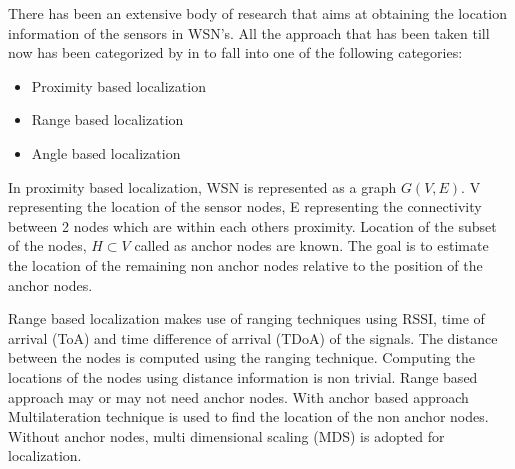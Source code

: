 

There has been an extensive body of research that aims at obtaining the location information of the sensors in WSN's. All the approach that has been taken till now has been categorized by \citeauthor{wang2010survey} in \cite{wang2010survey} to fall into one of the following categories:
\begin{itemize}
\item Proximity based localization
\item Range based localization
\item Angle based localization
\end{itemize}

In proximity based localization\cite{bulusu2000gps,4317866,shang2003localization}, WSN is represented as a graph $G(V,E)$. V representing the location of the sensor nodes, E representing the connectivity between 2 nodes which are within each others proximity. Location of the  subset of the nodes, $H \subset V$ called as anchor nodes are known. The goal is to estimate the location of the remaining non anchor nodes relative to the position of the anchor nodes. 

Range based localization makes use of  ranging techniques using RSSI\cite{mao2007path}, time of arrival (ToA)\cite{moses2003self} and time difference of arrival (TDoA) of the signals\cite{4058681}. The distance between the nodes is computed using the ranging technique. Computing the locations of the nodes using distance information is non trivial. Range based approach may or may not need anchor nodes. With anchor based approach Multilateration technique is used to find the location of the non anchor nodes. Without anchor nodes, multi dimensional scaling (MDS) is adopted for localization. 

